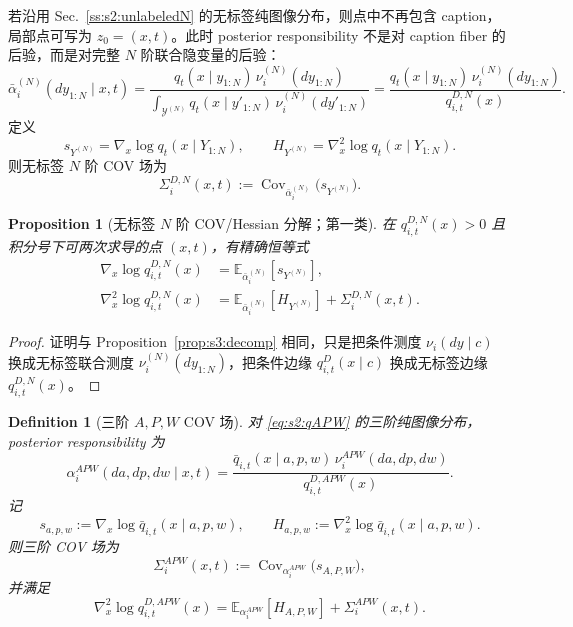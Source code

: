 \documentclass[11pt,a4paper]{article}
\newtheorem{proposition}[theorem]{Proposition}
\newtheorem{definition}[theorem]{Definition}
\DeclareMathOperator{\Cov}{Cov}
\newcommand{\E}{\mathbb{E}}
\newcommand{\cY}{\mathcal{Y}}
\begin{document}
若沿用 Sec.~\ref{ss:s2:unlabeledN} 的无标签纯图像分布，则点中不再包含 caption，局部点可写为 $z_0=(x,t)$。此时 posterior responsibility 不是对 caption fiber 的后验，而是对完整 $N$ 阶联合隐变量的后验：
\begin{equation}\label{eq:s3:alphaN}
\bar\alpha_i^{(N)}(dy_{1:N}\mid x,t)
=
\frac{q_t(x\mid y_{1:N})\,\nu_i^{(N)}(dy_{1:N})}
{\displaystyle\int_{\cY^{(N)}}q_t(x\mid y'_{1:N})\,\nu_i^{(N)}(dy'_{1:N})}
=
\frac{q_t(x\mid y_{1:N})\,\nu_i^{(N)}(dy_{1:N})}{q_{i,t}^{D,N}(x)}.
\end{equation}
定义
\begin{equation}\label{eq:s3:sHN}
s_{Y^{(N)}}=\nabla_x\log q_t(x\mid Y_{1:N}),\qquad
H_{Y^{(N)}}=\nabla_x^2\log q_t(x\mid Y_{1:N}).
\end{equation}
则无标签 $N$ 阶 COV 场为
\begin{equation}\label{eq:s3:SigmaN}
\Sigma_{i}^{D,N}(x,t)
:=
\Cov_{\bar\alpha_i^{(N)}}\!\big(s_{Y^{(N)}}\big).
\end{equation}

\begin{proposition}[无标签 $N$ 阶 COV/Hessian 分解；第一类]\label{prop:s3:Ncov}
在 $q_{i,t}^{D,N}(x)>0$ 且积分号下可两次求导的点 $(x,t)$，有精确恒等式
\begin{align}
\nabla_x\log q_{i,t}^{D,N}(x)
&=
\E_{\bar\alpha_i^{(N)}}[s_{Y^{(N)}}],\label{eq:s3:Nscore}\\
\nabla_x^2\log q_{i,t}^{D,N}(x)
&=
\E_{\bar\alpha_i^{(N)}}[H_{Y^{(N)}}]
+
\Sigma_i^{D,N}(x,t).\label{eq:s3:Nhess}
\end{align}
\end{proposition}

\begin{proof}
证明与 Proposition~\ref{prop:s3:decomp} 相同，只是把条件测度 $\nu_i(dy\mid c)$ 换成无标签联合测度 $\nu_i^{(N)}(dy_{1:N})$，把条件边缘 $q_{i,t}^{D}(x\mid c)$ 换成无标签边缘 $q_{i,t}^{D,N}(x)$。
\end{proof}

\begin{definition}[三阶 $A,P,W$ COV 场]\label{def:s3:APWcov}
对 \eqref{eq:s2:qAPW} 的三阶纯图像分布，posterior responsibility 为
\begin{equation}\label{eq:s3:alphaAPW}
\alpha_i^{APW}(da,dp,dw\mid x,t)
=
\frac{\bar q_{i,t}(x\mid a,p,w)\,\nu_i^{APW}(da,dp,dw)}
{q_{i,t}^{D,APW}(x)}.
\end{equation}
记
\begin{equation}\label{eq:s3:sHAPW}
s_{a,p,w}:=\nabla_x\log \bar q_{i,t}(x\mid a,p,w),\qquad
H_{a,p,w}:=\nabla_x^2\log \bar q_{i,t}(x\mid a,p,w).
\end{equation}
则三阶 COV 场为
\begin{equation}\label{eq:s3:SigmaAPW}
\Sigma_i^{APW}(x,t)
:=
\Cov_{\alpha_i^{APW}}\!\big(s_{A,P,W}\big),
\end{equation}
并满足
\begin{equation}\label{eq:s3:hessAPW}
\nabla_x^2\log q_{i,t}^{D,APW}(x)
=
\E_{\alpha_i^{APW}}[H_{A,P,W}]
+
\Sigma_i^{APW}(x,t).
\end{equation}
\end{definition}
\end{document}
